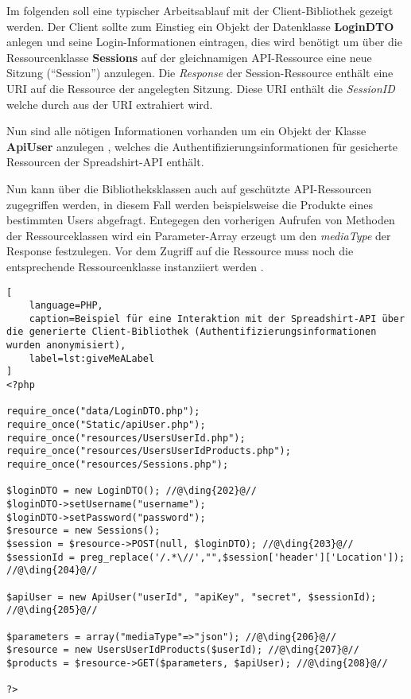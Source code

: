 
Im folgenden soll eine typischer Arbeitsablauf mit der Client-Bibliothek gezeigt werden. Der Client sollte zum Einstieg ein Objekt der Datenklasse \textbf{LoginDTO} anlegen  und seine Login-Informationen eintragen, dies wird benötigt um über die Ressourcenklasse \textbf{Sessions} auf der gleichnamigen \gls{API}-Ressource eine neue Sitzung (\enquote{Session}) anzulegen.
Die \emph{Response} der Session-Ressource enthält eine \gls{URI} auf die Ressource der angelegten Sitzung. Diese \gls{URI} enthält die \emph{SessionID} welche durch  aus der \gls{URI} extrahiert wird.

Nun sind alle nötigen Informationen vorhanden um ein Objekt der Klasse \textbf{ApiUser} anzulegen , welches die Authentifizierungsinformationen für gesicherte Ressourcen der Spreadshirt-\gls{API} enthält.

Nun kann über die Bibliotheksklassen auch auf geschützte \gls{API}-Ressourcen zugegriffen werden, in diesem Fall werden beispielsweise die Produkte eines bestimmten Users abgefragt. Entegegen den vorherigen Aufrufen von Methoden der Ressourceklassen wird ein Parameter-Array erzeugt  um den \emph{mediaType} der Response festzulegen.
Vor dem Zugriff auf die Ressource muss noch die entsprechende Ressourcenklasse instanziiert werden .

\begin{minipage}{\textwidth}
\begin{lstlisting}[
    language=PHP,
    caption=Beispiel für eine Interaktion mit der Spreadshirt-API über die generierte Client-Bibliothek (Authentifizierungsinformationen wurden anonymisiert),
    label=lst:giveMeALabel
]
<?php

require_once("data/LoginDTO.php");
require_once("Static/apiUser.php");
require_once("resources/UsersUserId.php");
require_once("resources/UsersUserIdProducts.php");
require_once("resources/Sessions.php");

$loginDTO = new LoginDTO(); //@\ding{202}@//
$loginDTO->setUsername("username");
$loginDTO->setPassword("password");
$resource = new Sessions();
$session = $resource->POST(null, $loginDTO); //@\ding{203}@//
$sessionId = preg_replace('/.*\//',"",$session['header']['Location']); //@\ding{204}@//

$apiUser = new ApiUser("userId", "apiKey", "secret", $sessionId); //@\ding{205}@//

$parameters = array("mediaType"=>"json"); //@\ding{206}@//
$resource = new UsersUserIdProducts($userId); //@\ding{207}@//
$products = $resource->GET($parameters, $apiUser); //@\ding{208}@//

?>
\end{lstlisting}
\end{minipage}

